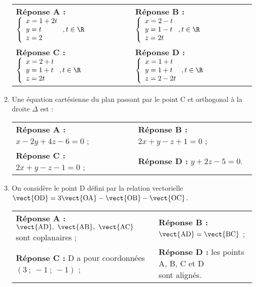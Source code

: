 \begin{enumerate}
\begin{center}
\begin{tabularx}{\linewidth}{X X}
\textbf{Réponse A :}$\left\{\begin{array}{l c l}x=1+2t\\y = t\\z = 2\end{array}\right., t \in \R$&
\textbf{Réponse B :} $\left\{\begin{array}{l c l}x =2 - t\\y = 1 - t\\z = 2t\end{array}\right., t \in \R$\\
\textbf{Réponse C :} $\left\{\begin{array}{l c l}x = 2 + t\\y = 1 + t\\z = 2t\end{array}\right., t \in \R$&
\textbf{Réponse D :} $\left\{\begin{array}{l c l}x = 1 + t\\y = 1 + t\\z = 2 - 2t\end{array}\right., t \in \R$
\end{tabularx}
\end{center}


\item Une équation cartésienne du plan passant par le point C et orthogonal à la droite $\Delta$ est :

\begin{center}
\begin{tabularx}{\linewidth}{X X}
\textbf{Réponse A :} $x - 2y + 4z - 6 = 0$ ;& \textbf{Réponse B :} $2x + y - z + 1 = 0$ ;\\
\textbf{Réponse C :} $2x + y - z- 1 = 0$ ;& \textbf{Réponse D :} $y + 2z - 5 = 0$.
\end{tabularx}
\end{center}


\item On considère le point D défini par la relation vectorielle $\vect{\text{OD}} = 3\vect{\text{OA}} - \vect{\text{OB}} - \vect{\text{OC}}$.

\begin{center}
\begin{tabularx}{\linewidth}{X X}
\textbf{Réponse A :} \parbox[t]{4cm}{$\vect{\text{AD}},~ \vect{\text{AB}},~ \vect{\text{AC}}$ sont\\ coplanaires ;} &\textbf{Réponse B :} $\vect{\text{AD}} = \vect{\text{BC}}$ ;\\
\textbf{Réponse C :} \parbox[t]{4cm}{D a pour coordonnées\\ $(3~;~-1~;~-1)$ ;} &\textbf{Réponse D :} \parbox[t]{4cm}{les points A, B, C et D\\ sont alignés.}
\end{tabularx}
\end{center}

\end{enumerate}

\bigskip

